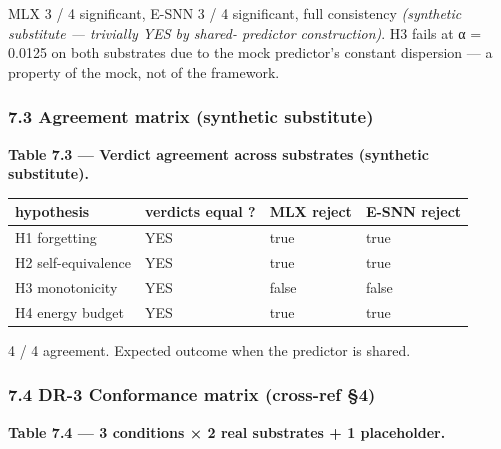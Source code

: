 \documentclass[
]{article}
\newcounter{none} %
\begin{document}
MLX 3 / 4 significant, E-SNN 3 / 4 significant, full consistency
\emph{(synthetic substitute --- trivially YES by shared- predictor
construction)}. H3 fails at α = 0.0125 on both substrates due to the
mock predictor's constant dispersion --- a property of the mock, not of
the framework.

\subsubsection{7.3 Agreement matrix (synthetic
substitute)}\label{agreement-matrix-synthetic-substitute}

\textbf{Table 7.3 --- Verdict agreement across substrates (synthetic
substitute).}

{\def\LTcaptype{none} %
\begin{longtable}[]{@{}llll@{}}
\toprule\noalign{}
hypothesis & verdicts equal ? & MLX reject & E-SNN reject \\
\midrule\noalign{}
\endhead
\bottomrule\noalign{}
\endlastfoot
H1 forgetting & YES & true & true \\
H2 self-equivalence & YES & true & true \\
H3 monotonicity & YES & false & false \\
H4 energy budget & YES & true & true \\
\end{longtable}
}

4 / 4 agreement. Expected outcome when the predictor is shared.

\subsubsection{7.4 DR-3 Conformance matrix (cross-ref
§4)}\label{dr-3-conformance-matrix-cross-ref-4}

\textbf{Table 7.4 --- 3 conditions × 2 real substrates + 1 placeholder.}
\end{document}
